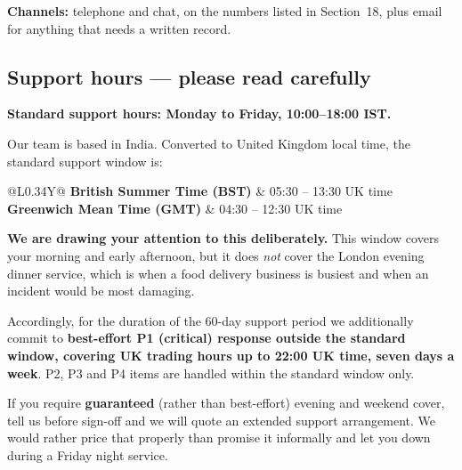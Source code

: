 \documentclass[11pt,a4paper]{article}
\begin{document}
\vspace{6pt}
\textbf{Channels:} telephone and chat, on the numbers listed in Section~18, plus email
for anything that needs a written record.

\subsection{Support hours --- please read carefully}

\begin{tcolorbox}[enhanced,colback=brandlight,colframe=brandnavy,boxrule=0pt,leftrule=3pt,
  arc=0pt,outer arc=0pt,left=12pt,right=12pt,top=10pt,bottom=10pt]
\textbf{Standard support hours: Monday to Friday, 10:00--18:00 IST.}

\vspace{4pt}
Our team is based in India. Converted to United Kingdom local time, the standard support
window is:

\vspace{2pt}
\begin{tabularx}{\linewidth}{@{}L{0.34\linewidth}Y@{}}
\textbf{British Summer Time (BST)} & 05:30 -- 13:30 UK time \\
\textbf{Greenwich Mean Time (GMT)} & 04:30 -- 12:30 UK time \\
\end{tabularx}

\vspace{6pt}
\textbf{We are drawing your attention to this deliberately.} This window covers your
morning and early afternoon, but it does \emph{not} cover the London evening dinner
service, which is when a food delivery business is busiest and when an incident would be
most damaging.

\vspace{4pt}
Accordingly, for the duration of the 60-day support period we additionally commit to
\textbf{best-effort P1 (critical) response outside the standard window, covering UK
trading hours up to 22:00 UK time, seven days a week}. P2, P3 and P4 items are handled
within the standard window only.

\vspace{4pt}
If you require \textbf{guaranteed} (rather than best-effort) evening and weekend cover,
tell us before sign-off and we will quote an extended support arrangement. We would
rather price that properly than promise it informally and let you down during a Friday
night service.
\end{tcolorbox}
\end{document}
